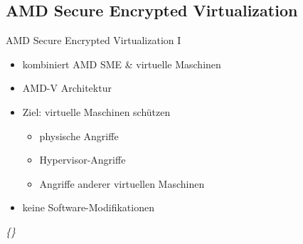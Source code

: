 \documentclass{sdqbeamer}
\begin{document}
\subsection{AMD Secure Encrypted Virtualization}
\begin{frame}{AMD Secure Encrypted Virtualization I}
	\begin{itemize}
		\item kombiniert AMD SME \& virtuelle Maschinen
		\item AMD-V Architektur
		\item Ziel: virtuelle Maschinen schützen
		\begin{itemize}
			\item physische Angriffe
			\item Hypervisor-Angriffe
			\item Angriffe anderer virtuellen Maschinen
		\end{itemize}
		\item keine Software-Modifikationen
	\end{itemize}
	\vfill
	\small\textit{\{\cite{kaplan, buhren}\}}
\end{frame}
\end{document}
